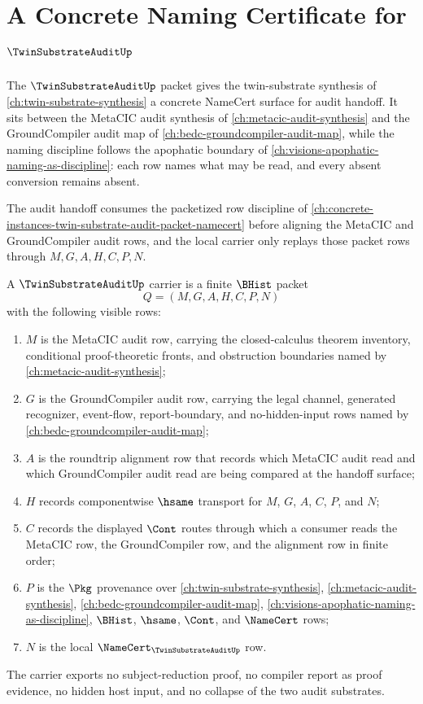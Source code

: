 \chapter{A Concrete Naming Certificate for $\TwinSubstrateAuditUp$}
\label{ch:concrete-instances-twin-substrate-audit-namecert}

The $\TwinSubstrateAuditUp$ packet gives the twin-substrate synthesis of \autoref{ch:twin-substrate-synthesis} a concrete NameCert surface for audit handoff. It sits between the MetaCIC audit synthesis of \autoref{ch:metacic-audit-synthesis} and the GroundCompiler audit map of \autoref{ch:bedc-groundcompiler-audit-map}, while the naming discipline follows the apophatic boundary of \autoref{ch:visions-apophatic-naming-as-discipline}: each row names what may be read, and every absent conversion remains absent.

The audit handoff consumes the packetized row discipline of \autoref{ch:concrete-instances-twin-substrate-audit-packet-namecert} before aligning the MetaCIC and GroundCompiler audit rows, and the local carrier only replays those packet rows through $M,G,A,H,C,P,N$.

\begin{definition}
\label{def:twin-substrate-audit-carrier}
A $\TwinSubstrateAuditUp$ carrier is a finite $\BHist$ packet
$$
Q=(M,G,A,H,C,P,N)
$$
with the following visible rows:
\begin{enumerate}
\item $M$ is the MetaCIC audit row, carrying the closed-calculus theorem inventory, conditional proof-theoretic fronts, and obstruction boundaries named by \autoref{ch:metacic-audit-synthesis};
\item $G$ is the GroundCompiler audit row, carrying the legal channel, generated recognizer, event-flow, report-boundary, and no-hidden-input rows named by \autoref{ch:bedc-groundcompiler-audit-map};
\item $A$ is the roundtrip alignment row that records which MetaCIC audit read and which GroundCompiler audit read are being compared at the handoff surface;
\item $H$ records componentwise $\hsame$ transport for $M$, $G$, $A$, $C$, $P$, and $N$;
\item $C$ records the displayed $\Cont$ routes through which a consumer reads the MetaCIC row, the GroundCompiler row, and the alignment row in finite order;
\item $P$ is the $\Pkg$ provenance over \autoref{ch:twin-substrate-synthesis}, \autoref{ch:metacic-audit-synthesis}, \autoref{ch:bedc-groundcompiler-audit-map}, \autoref{ch:visions-apophatic-naming-as-discipline}, $\BHist$, $\hsame$, $\Cont$, and $\NameCert$ rows;
\item $N$ is the local $\NameCert_{\TwinSubstrateAuditUp}$ row.
\end{enumerate}
The carrier exports no subject-reduction proof, no compiler report as proof evidence, no hidden host input, and no collapse of the two audit substrates.
\end{definition}

